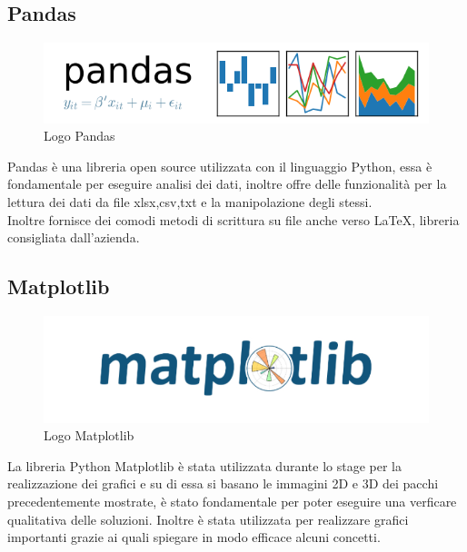 \subsection{Pandas}
\begin{figure}[H]
	\begin{center} \includegraphics[scale=0.6]{figures/pandas_logo}
		\caption[Logo Pandas]{Logo Pandas}
	\end{center}
\end{figure}
Pandas è una libreria open source utilizzata con il linguaggio Python, essa è fondamentale per eseguire analisi dei dati, inoltre offre delle funzionalità per la lettura dei dati da file xlsx,csv,txt e la manipolazione degli stessi. \\
Inoltre fornisce dei comodi metodi di scrittura su file anche verso \LaTeX, libreria consigliata dall'azienda.

\subsection{Matplotlib}
\begin{figure}[H]
	\begin{center} \includegraphics[scale=0.4]{figures/matplotlib-1}
		\caption[Logo Matplotlib]{Logo Matplotlib}
	\end{center}
\end{figure}
La libreria Python Matplotlib è stata utilizzata durante lo stage per la realizzazione dei grafici e su di essa si basano le immagini 2D e 3D dei pacchi precedentemente mostrate, è stato fondamentale per poter eseguire una verficare qualitativa delle soluzioni. Inoltre è stata utilizzata per realizzare grafici importanti grazie ai quali spiegare in modo efficace alcuni concetti.

